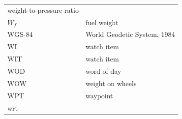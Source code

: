 \documentclass[
]{book}
\begin{document}
\begin{longtable}[]{@{}ll@{}}
\begin{minipage}[t]{0.47\columnwidth}
weight-to-pressure ratio\strut
\end{minipage}\tabularnewline
\begin{minipage}[t]{0.47\columnwidth}\raggedright
\(W_f\)\strut
\end{minipage} & \begin{minipage}[t]{0.47\columnwidth}\raggedright
fuel weight\strut
\end{minipage}\tabularnewline
\begin{minipage}[t]{0.47\columnwidth}\raggedright
WGS-84\strut
\end{minipage} & \begin{minipage}[t]{0.47\columnwidth}\raggedright
World Geodetic System, 1984\strut
\end{minipage}\tabularnewline
\begin{minipage}[t]{0.47\columnwidth}\raggedright
WI\strut
\end{minipage} & \begin{minipage}[t]{0.47\columnwidth}\raggedright
watch item\strut
\end{minipage}\tabularnewline
\begin{minipage}[t]{0.47\columnwidth}\raggedright
WIT\strut
\end{minipage} & \begin{minipage}[t]{0.47\columnwidth}\raggedright
watch item\strut
\end{minipage}\tabularnewline
\begin{minipage}[t]{0.47\columnwidth}\raggedright
WOD\strut
\end{minipage} & \begin{minipage}[t]{0.47\columnwidth}\raggedright
word of day\strut
\end{minipage}\tabularnewline
\begin{minipage}[t]{0.47\columnwidth}\raggedright
WOW\strut
\end{minipage} & \begin{minipage}[t]{0.47\columnwidth}\raggedright
weight on wheels\strut
\end{minipage}\tabularnewline
\begin{minipage}[t]{0.47\columnwidth}\raggedright
WPT\strut
\end{minipage} & \begin{minipage}[t]{0.47\columnwidth}\raggedright
waypoint\strut
\end{minipage}\tabularnewline
\begin{minipage}[t]{0.47\columnwidth}\raggedright
wrt\strut
\end{minipage} & \begin{minipage}[t]{0.47\columnwidth}\raggedright

\end{minipage}
\end{longtable}
\end{document}
